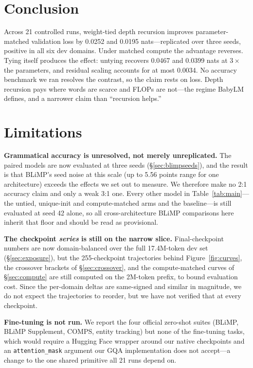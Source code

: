 \documentclass[11pt]{article}
\begin{document}
\section{Conclusion}

Across 21 controlled runs, weight-tied depth recursion improves parameter-matched validation loss by 0.0252 and 0.0195 nats---replicated over three seeds, positive in all six dev domains. Under matched compute the advantage reverses. Tying itself produces the effect: untying recovers 0.0467 and 0.0399 nats at $3\times$ the parameters, and residual scaling accounts for at most 0.0034. No accuracy benchmark we ran resolves the contrast, so the claim rests on loss. Depth recursion pays where words are scarce and FLOPs are not---the regime BabyLM defines, and a narrower claim than ``recursion helps.''

\section*{Limitations}

\textbf{Grammatical accuracy is unresolved, not merely unreplicated.} The paired models are now evaluated at three seeds (\S\ref{sec:blimpseeds}), and the result is that BLiMP's seed noise at this scale (up to 5.56 points range for one architecture) exceeds the effects we set out to measure. We therefore make no 2:1 accuracy claim and only a weak 3:1 one. Every other model in Table~\ref{tab:main}---the untied, unique-init and compute-matched arms and the baseline---is still evaluated at seed 42 alone, so all cross-architecture BLiMP comparisons here inherit that floor and should be read as provisional.

\textbf{The checkpoint \emph{series} is still on the narrow slice.} Final-checkpoint numbers are now domain-balanced over the full 17.4M-token dev set (\S\ref{sec:exposure}), but the 255-checkpoint trajectories behind Figure~\ref{fig:curves}, the crossover brackets of \S\ref{sec:crossover}, and the compute-matched curves of \S\ref{sec:compute} are still computed on the 2M-token prefix, to bound evaluation cost. Since the per-domain deltas are same-signed and similar in magnitude, we do not expect the trajectories to reorder, but we have not verified that at every checkpoint.

\textbf{Fine-tuning is not run.} We report the four official zero-shot suites (BLiMP, BLiMP Supplement, COMPS, entity tracking) but none of the fine-tuning tasks, which would require a Hugging Face wrapper around our native checkpoints and an \texttt{attention\_mask} argument our GQA implementation does not accept---a change to the one shared primitive all 21 runs depend on.
\end{document}

